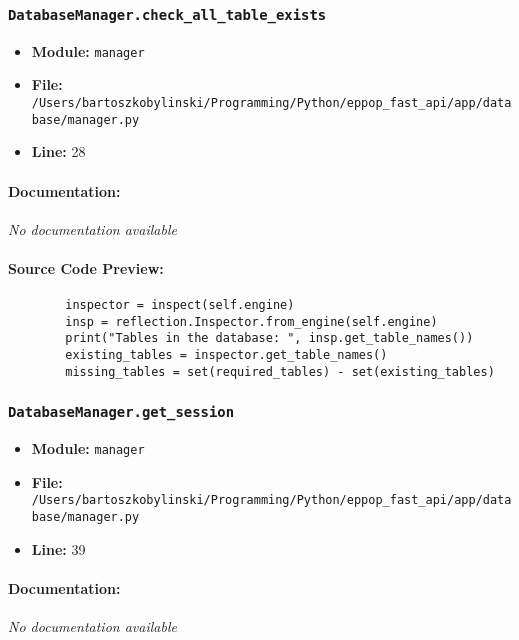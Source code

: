 \documentclass[11pt,a4paper]{article}
\begin{document}
\vspace{1em}
\subsubsection{\texttt{DatabaseManager.check\_all\_table\_exists}}

\begin{itemize}
    \item \textbf{Module:} \texttt{manager}
    \item \textbf{File:} \texttt{/Users/bartoszkobylinski/Programming/Python/eppop\_fast\_api/app/database/manager.py}
    \item \textbf{Line:} 28
\end{itemize}

\paragraph{Documentation:} \textit{No documentation available}

\paragraph{Source Code Preview:}
\begin{verbatim}
        inspector = inspect(self.engine)
        insp = reflection.Inspector.from_engine(self.engine)
        print("Tables in the database: ", insp.get_table_names())
        existing_tables = inspector.get_table_names()
        missing_tables = set(required_tables) - set(existing_tables)
\end{verbatim}

\vspace{1em}
\subsubsection{\texttt{DatabaseManager.get\_session}}

\begin{itemize}
    \item \textbf{Module:} \texttt{manager}
    \item \textbf{File:} \texttt{/Users/bartoszkobylinski/Programming/Python/eppop\_fast\_api/app/database/manager.py}
    \item \textbf{Line:} 39
\end{itemize}

\paragraph{Documentation:} \textit{No documentation available}
\end{document}
